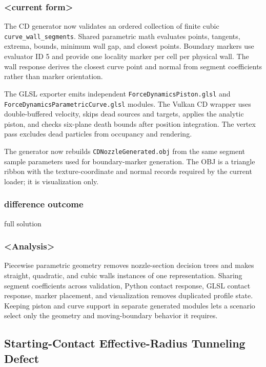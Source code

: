 \subsubsection{<current form>}

The CD generator now validates an ordered collection of finite cubic
\texttt{curve\_wall\_segments}.  Shared parametric math evaluates points,
tangents, extrema, bounds, minimum wall gap, and closest points.  Boundary
markers use evaluator ID 5 and provide one locality marker per cell per
physical wall.  The wall response derives the closest curve point and normal
from segment coefficients rather than marker orientation.

The GLSL exporter emits independent
\texttt{ForceDynamicsPiston.glsl} and
\texttt{ForceDynamicsParametricCurve.glsl} modules.  The Vulkan CD wrapper
uses double-buffered velocity, skips dead sources and targets, applies the
analytic piston, and checks six-plane death bounds after position integration.
The vertex pass excludes dead particles from occupancy and rendering.

The generator now rebuilds \texttt{CDNozzleGenerated.obj} from the same
segment sample parameters used for boundary-marker generation.  The OBJ is a
triangle ribbon with the texture-coordinate and normal records required by the
current loader; it is visualization only.

\subsubsection{difference outcome}

full solution

\subsubsection{<Analysis>}

Piecewise parametric geometry removes nozzle-section decision trees and makes
straight, quadratic, and cubic walls instances of one representation.  Sharing
segment coefficients across validation, Python contact response, GLSL contact
response, marker placement, and visualization removes duplicated profile
state.  Keeping piston and curve support in separate generated modules lets a
scenario select only the geometry and moving-boundary behavior it requires.

\subsection{Starting-Contact Effective-Radius Tunneling Defect}

